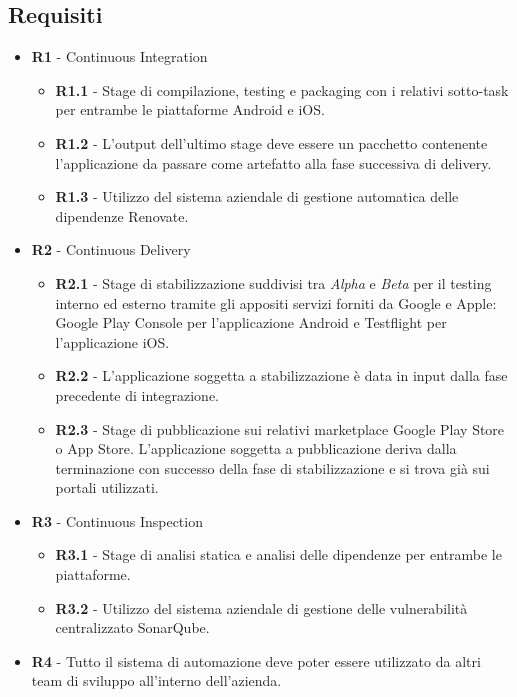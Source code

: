 \subsection{Requisiti}
\begin{itemize}
    \item \textbf{R1} - Continuous Integration
    \begin{itemize}
        \item \textbf{R1.1} - Stage di compilazione, testing e packaging con i relativi sotto-task per entrambe le piattaforme Android e iOS.
        \item \textbf{R1.2} - L'output dell'ultimo stage deve essere un pacchetto contenente l'applicazione da passare come artefatto alla fase successiva di delivery.
        \item \textbf{R1.3} - Utilizzo del sistema aziendale di gestione automatica delle dipendenze Renovate.
    \end{itemize}
    \item \textbf{R2} - Continuous Delivery
    \begin{itemize}
        \item \textbf{R2.1} - Stage di stabilizzazione suddivisi tra \textit{Alpha} e \textit{Beta} per il testing interno ed esterno tramite gli appositi servizi forniti da Google e Apple: Google Play Console per l'applicazione Android e Testflight per l'applicazione iOS.
        \item \textbf{R2.2} - L'applicazione soggetta a stabilizzazione è data in input dalla fase precedente di integrazione.
        \item \textbf{R2.3} - Stage di pubblicazione sui relativi marketplace Google Play Store o App Store. L'applicazione soggetta a pubblicazione deriva dalla terminazione con successo della fase di stabilizzazione e si trova già sui portali utilizzati.
    \end{itemize}
    \item \textbf{R3} - Continuous Inspection
    \begin{itemize}
        \item \textbf{R3.1} - Stage di analisi statica e analisi delle dipendenze per entrambe le piattaforme.
        \item \textbf{R3.2} - Utilizzo del sistema aziendale di gestione delle vulnerabilità centralizzato SonarQube.
    \end{itemize}
    \item \textbf{R4} - Tutto il sistema di automazione deve poter essere utilizzato da altri team di sviluppo all'interno dell'azienda.
\end{itemize}


